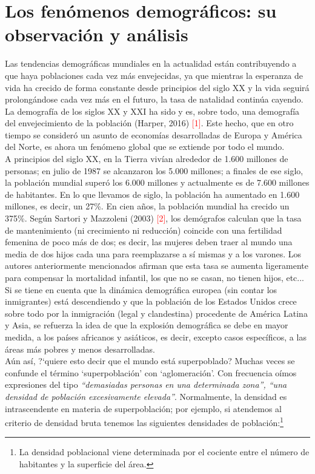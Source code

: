 \section{Los fen\'omenos demogr\'aficos: su observaci\'on y an\'alisis}

Las tendencias demogr\'aficas mundiales en la actualidad est\'an contribuyendo a que haya poblaciones cada vez m\'as envejecidas, ya que mientras la esperanza de vida ha crecido de forma constante desde principios del siglo XX y la vida seguir\'a prolong\'andose cada vez m\'as en el futuro, la tasa de natalidad contin\'ua cayendo. La demograf\'ia de los siglos XX y XXI ha sido y es, sobre todo, una demograf\'ia del envejecimiento de la poblaci\'on (Harper, 2016) \textcolor{red}{[1]}. Este hecho, que en otro tiempo se consider\'o un asunto de econom\'ias desarrolladas de Europa y Am\'erica del Norte, es ahora un fen\'omeno global que se extiende por todo el mundo.\\

A principios del siglo XX, en la Tierra viv\'ian alrededor de 1.600 millones de personas; en julio de 1987 se alcanzaron los 5.000 millones; a finales de ese siglo, la poblaci\'on mundial super\'o los 6.000 millones y actualmente es de 7.600 millones de habitantes. En lo que llevamos de siglo, la poblaci\'on ha aumentado en 1.600 millones, es decir, un 27\%. En cien a\~nos, la poblaci\'on mundial ha crecido un 375\%. Seg\'un Sartori y Mazzoleni (2003) \textcolor{red}{[2]}, los dem\'ografos calculan que la tasa de mantenimiento (ni crecimiento ni reducci\'on) coincide con una fertilidad femenina de poco m\'as de dos; es decir, las mujeres deben traer al mundo una media de dos hijos cada una para reemplazarse a s\'i mismas y a los varones. Los autores anteriormente mencionados afirman que esta tasa se aumenta ligeramente para compensar la mortalidad infantil, los que no se casan, no tienen hijos, etc... Si se tiene en cuenta que la din\'amica demogr\'afica europea (sin contar los inmigrantes) est\'a descendiendo y que la poblaci\'on de los Estados Unidos crece sobre todo por la inmigraci\'on (legal y clandestina) procedente de Am\'erica Latina y Asia, se refuerza la idea de que la explosi\'on demogr\'afica se debe en mayor medida, a los pa\'ises africanos y asi\'aticos, es decir, excepto casos espec\'ificos, a las \'areas m\'as pobres y menos desarrolladas.\\ 

A\'un as\'i, ?`quiere esto decir que el mundo est\'a superpoblado? Muchas veces se confunde el t\'ermino `superpoblaci\'on' con `aglomeraci\'on'. Con frecuencia o\'imos expresiones del tipo \textit{``demasiadas personas en una determinada zona'', ``una densidad de poblaci\'on excesivamente elevada''}. Normalmente, la densidad es intrascendente en materia de superpoblaci\'on; por ejemplo, si atendemos al criterio de densidad bruta tenemos las siguientes densidades de poblaci\'on:\footnote{La densidad poblacional viene determinada por el cociente entre el n\'umero de habitantes y la superficie del \'area.}

